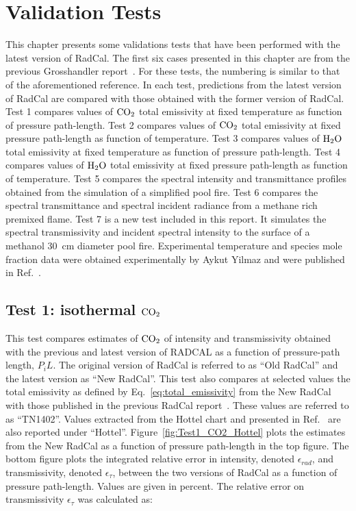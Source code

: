 

\chapter{Validation Tests}
\label{chap::validation_tests}

This chapter presents some validations tests that have been performed with the latest version of RadCal. The first six cases presented in this chapter are from the previous Grosshandler report~\cite{Grosshandler1993}. For these tests, the numbering is similar to that of the aforementioned reference. In each test, predictions from the latest version of RadCal are compared with those obtained with the former version of RadCal. Test 1 compares values of {$\rm CO_2$} total emissivity at fixed temperature as function of pressure path-length. Test 2 compares values of {$\rm CO_2$} total emissivity at fixed pressure path-length as function of temperature. Test 3 compares values of {$\rm H_2O$} total emissivity at fixed temperature as function of pressure path-length. Test 4 compares values of {$\rm H_2O$} total emissivity at fixed pressure path-length as function of temperature. Test 5 compares the spectral intensity and transmittance profiles obtained from the simulation of a simplified pool fire. Test 6 compares the spectral transmittance and spectral incident radiance from a methane rich premixed flame. Test 7 is a new test included in this report. It simulates the spectral transmissivity and incident spectral intensity to the surface of a methanol 30~cm diameter pool fire. Experimental temperature and species mole fraction data were obtained experimentally by Aykut Yilmaz and were published in Ref.~\cite{Yilmaz2008}.


\section{Test 1: isothermal {$\rm CO_2$}}

This test compares estimates of {$\rm CO_2$} of intensity and transmissivity obtained with the previous and latest version of RADCAL as a function of pressure-path length, $P_iL$. The original version of RadCal is referred to as ``Old RadCal'' and the latest version as ``New RadCal''. This test also compares at selected values the total emissivity as defined by Eq.~\ref{eq:total_emissivity} from the New RadCal with those published in the previous RadCal report~\cite{Grosshandler1993}. These values are referred to as ``TN1402''. Values extracted from the Hottel chart and presented in Ref.~\cite{Grosshandler1993} are also reported under ``Hottel''.
Figure~\ref{fig:Test1_CO2_Hottel} plots the estimates from the New RadCal as a function of pressure path-length in the top figure. The bottom figure plots the integrated relative error in intensity, denoted $\epsilon_{rad}$, and transmissivity, denoted $\epsilon_{\tau}$, between the two versions of RadCal as a function of pressure path-length. Values are given in percent. The relative error on transmissivity $\epsilon_{\tau}$ was calculated as:

